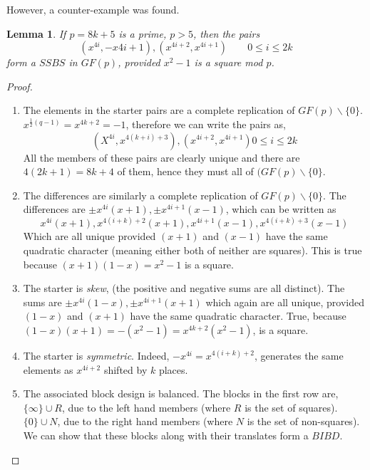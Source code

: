 \documentclass[11pt, a4paper]{book}\usepackage[]{graphicx}\usepackage[]{xcolor}
\newcounter{example}
\newtheorem{lemma}[theorem]{Lemma}
\begin{document}
However, a counter-example was found.
\begin{lemma}
If $p = 8k + 5$ is a prime, $p > 5$, then the pairs
\begin{equation}
(x^{4i}, -x{4i + 1}), (x^{4i + 2}, x^{4i + 1}) \qquad 0 \leq i \leq 2k
\end{equation}
form a $SSBS$ in $GF(p)$, provided $x^2 - 1$ is a square mod
$p$.
\end{lemma}
\begin{proof}
\begin{enumerate}
\item{The elements in the starter pairs are a complete
    replication of $GF(p) \backslash \{0\}$.
    $x^{\frac{1}{2} (q - 1)} = x^{4k + 2} = -1$, therefore we
    can write the pairs as,
    $$(X^{4i}, x^{4(k + i) + 3}), (x^{4i + 2}, x^{4i + 1}) 0 \leq i \leq 2k$$
    All the members of these pairs are clearly unique and
    there are $4(2k + 1) = 8k + 4$ of them, hence they must all of
    $(GF(p) \backslash \{0\}$.}
\item{The differences are similarly a complete replication of
    $GF(p) \backslash \{0\}$. The differences are
    $\pm x^{4i}(x + 1), \pm x^{4i + 1}(x - 1)$, which can be written
    as
    $$x^{4i}(x + 1), x^{4(i + k) + 2}(x + 1), x^{4i + 1}(x - 1), x^{4(i + k) + 3}(x-1)$$
    Which are all unique provided $(x + 1)$ and $(x - 1)$ have
    the same quadratic character (meaning either both of
    neither are squares).  This is true because
    $(x + 1)(1 - x) = x^2 - 1$ is a square.}
\item{The starter is \emph{skew}, (the positive and negative sums
    are all distinct).  The sums are
    $\pm x^{4i}(1 - x), \pm x^{4i + 1}(x + 1)$
    which again are all unique, provided
    $(1 - x)$ and $(x + 1)$ have the same quadratic
    character.  True, because
    $(1 - x)(x  +1) = -(x^2 - 1) = x^{4k + 2}(x^2  -1)$, is a square.}
\item{The starter is \emph{symmetric}.
    Indeed, $-x^{4i} = x^{4(i + k) + 2}$, generates the
    same elements as $x^{4i + 2}$ shifted by $k$ places.}
\item{The associated block design is balanced.  The blocks in
    the first row are, $\{\infty\} \cup R$, due to the left
    hand members (where $R$ is the set of squares).
    $\{0\} \cup N$, due to the right hand members (where
    $N$ is the set of non-squares).
    We can show that these blocks along with their translates
    form a $BIBD$.
    
}
\end{enumerate}
\end{proof}
\end{document}
